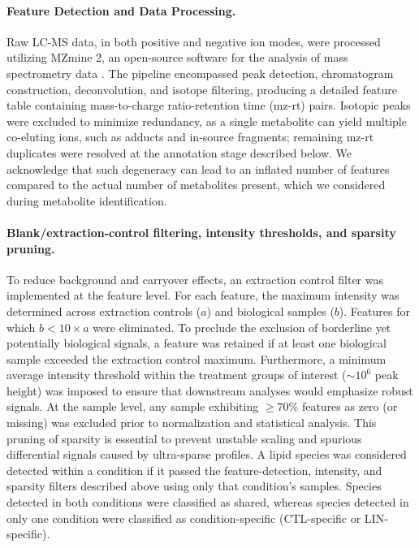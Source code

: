 \documentclass[9pt,twocolumn,twoside]{rilabRxiv}
\begin{document}
\paragraph{Feature Detection and Data Processing.}
Raw LC-MS data, in both positive and negative ion modes, were processed utilizing MZmine 2, an open-source software for the analysis of mass spectrometry data \citep{Pluskal2010MZmine2}. The pipeline encompassed peak detection, chromatogram construction, deconvolution, and isotope filtering, producing a detailed feature table containing mass-to-charge ratio-retention time (mz-rt) pairs. Isotopic peaks were excluded to minimize redundancy, as a single metabolite can yield multiple co-eluting ions, such as adducts and in-source fragments; remaining mz-rt duplicates were resolved at the annotation stage described below. We acknowledge that such degeneracy can lead to an inflated number of features compared to the actual number of metabolites present, which we considered during metabolite identification.

\paragraph{Blank/extraction-control filtering, intensity thresholds, and sparsity pruning.}

To reduce background and carryover effects, an extraction control filter was implemented at the feature level. For each feature, the maximum intensity was determined across extraction controls ($a$) and biological samples ($b$). Features for which $b < 10\times a$ were eliminated. To preclude the exclusion of borderline yet potentially biological signals, a feature was retained if at least one biological sample exceeded the extraction control maximum. Furthermore, a minimum average intensity threshold within the treatment groups of interest ($\sim 10^{6}$ peak height) was imposed to ensure that downstream analyses would emphasize robust signals. At the sample level, any sample exhibiting $\geq 70\%$ features as zero (or missing) was excluded prior to normalization and statistical analysis. This pruning of sparsity is essential to prevent unstable scaling and spurious differential signals caused by ultra-sparse profiles. A lipid species was considered detected within a condition if it passed the feature-detection, intensity, and sparsity filters described above using only that condition's samples. Species detected in both conditions were classified as shared, whereas species detected in only one condition were classified as condition-specific (CTL-specific or LIN-specific).
\end{document}
